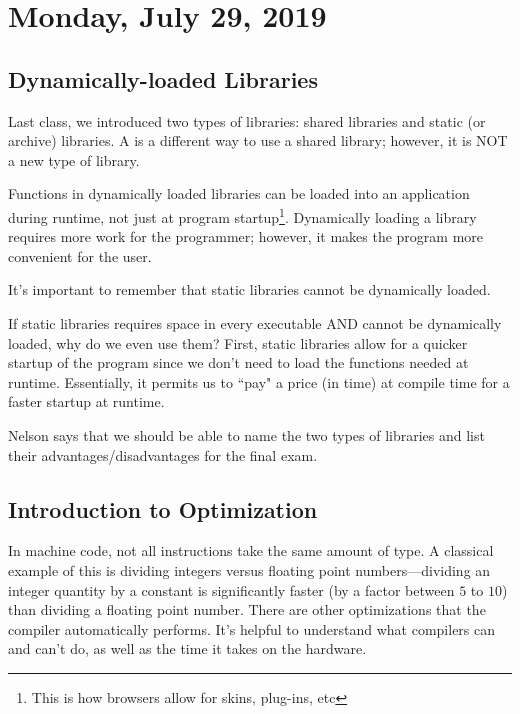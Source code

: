 \section{Monday, July 29, 2019}
\subsection{Dynamically-loaded Libraries}
Last class, we introduced two types of libraries: shared libraries and static (or archive) libraries. A  is a different way to use a shared library; however, it is NOT a new type of library.

Functions in dynamically loaded libraries can be loaded into an application during runtime, not just at program startup\footnote{This is how browsers allow for skins, plug-ins, etc}. Dynamically loading a library requires more work for the programmer; however, it makes the program more convenient for the user. 

It's important to remember that static libraries cannot be dynamically loaded. 

If static libraries requires space in every executable AND cannot be dynamically loaded, why do we even use them? First, static libraries allow for a quicker startup of the program since we don't need to load the functions needed at runtime. Essentially, it permits us to ``pay" a price (in time) at compile time for a faster startup at runtime. 

Nelson says that we should be able to name the two types of libraries and list their advantages/disadvantages for the final exam.

\subsection{Introduction to Optimization} 
In machine code, not all instructions take the same amount of type. A classical example of this is dividing integers versus floating point numbers---dividing an integer quantity by a constant is significantly faster (by a factor between $5$ to $10$) than dividing a floating point number. There are other optimizations that the compiler automatically performs. It's helpful to understand what compilers can and can't do, as well as the time it takes on the hardware.

